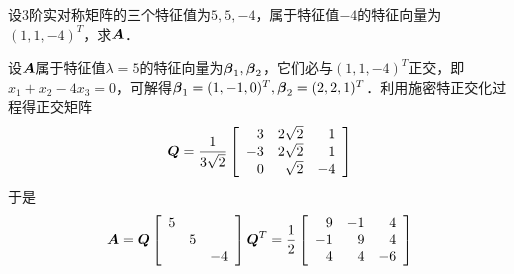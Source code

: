 \begin{frame}
  \begin{li}[\red{$\bigstar$}]
    设$3$阶实对称矩阵的三个特征值为$5,5,-4$，属于特征值$-4$的特征向量为$(1,1,-4)^T$，求$\boldsymbol{A}$．
  \end{li} \pause
  \begin{jie}
    设$\boldsymbol{A}$属于特征值$\lambda=5$的特征向量为$\boldsymbol{\beta}_1,\boldsymbol{\beta}_2$，它们必与$(1,1,-4)^T$正交，即$x_1+x_2-4x_3=0$，可解得$\boldsymbol{\beta}_1=(1,-1,0)^T, \boldsymbol{\beta}_2=(2,2,1)^T$．利用施密特正交化过程得正交矩阵
    $$
    \boldsymbol{Q}=\frac1{3\sqrt2}\left[
      \begin{array}{rrr}
        3&2\sqrt2&1\\
        -3&2\sqrt2&1\\
        0&\sqrt2&-4
      \end{array}
    \right]
    $$
    于是
    $$
    \boldsymbol{A}=\boldsymbol{Q}\left[
      \begin{array}{rrr}
        5&&\\
        &5&\\
        &&-4
      \end{array}
    \right]\boldsymbol{Q}^T=\frac12\left[
      \begin{array}{rrr}
        9&-1&4\\
        -1&9&4\\
         4&4&-6
      \end{array}
    \right]
    $$
  \end{jie}
\end{frame}